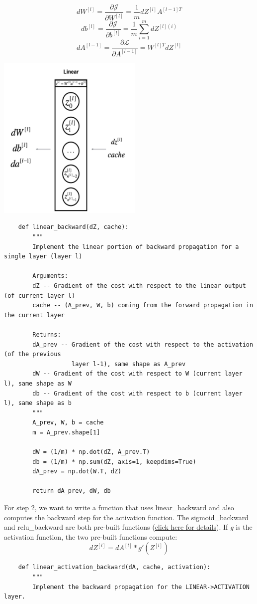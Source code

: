 \documentclass[11pt, a4paper]{article}
\begin{document}
\begin{spacing}{1.1}
	\begin{minipage}[c]{9cm}
	$$ dW^{[l]} = \frac{\partial \mathcal{J} }{\partial W^{[l]}} = \frac{1}{m} dZ^{[l]} A^{[l-1] T}$$
	$$ db^{[l]} = \frac{\partial \mathcal{J} }{\partial b^{[l]}} = \frac{1}{m} \sum_{i = 1}^{m} dZ^{[l](i)}$$
	$$ dA^{[l-1]} = \frac{\partial \mathcal{L} }{\partial A^{[l-1]}} = W^{[l] T} dZ^{[l]}$$
	\end{minipage}
	\begin{minipage}[c]{8cm}
	\includegraphics[scale=.9]{linear_back}
	\end{minipage} \newpage

	\begin{lstlisting}
	def linear_backward(dZ, cache):
		"""
		Implement the linear portion of backward propagation for a single layer (layer l)
		
		Arguments:
		dZ -- Gradient of the cost with respect to the linear output (of current layer l)
		cache -- (A_prev, W, b) coming from the forward propagation in the current layer
		
		Returns:
		dA_prev -- Gradient of the cost with respect to the activation (of the previous 
		           layer l-1), same shape as A_prev
		dW -- Gradient of the cost with respect to W (current layer l), same shape as W
		db -- Gradient of the cost with respect to b (current layer l), same shape as b
		"""
		A_prev, W, b = cache
		m = A_prev.shape[1]
		
		dW = (1/m) * np.dot(dZ, A_prev.T)
		db = (1/m) * np.sum(dZ, axis=1, keepdims=True)
		dA_prev = np.dot(W.T, dZ)

		return dA_prev, dW, db \end{lstlisting} \vspace*{1mm}
	For step 2, we want to write a function that uses linear\_backward and also computes the backward step for the activation function. The sigmoid\_backward and relu\_backward are both pre-built functions (\href{https://www.kaggle.com/kolisnehar/dnn-utils-v2}{click here for details}). If \textit{g} is the activation function, the two pre-built functions compute: $$dZ^{[l]} = dA^{[l]} * g'(Z^{[l]}) $$
	\begin{lstlisting}
	def linear_activation_backward(dA, cache, activation):
		"""
		Implement the backward propagation for the LINEAR->ACTIVATION layer.
		

\end{lstlisting}
\end{spacing}
\end{document}
